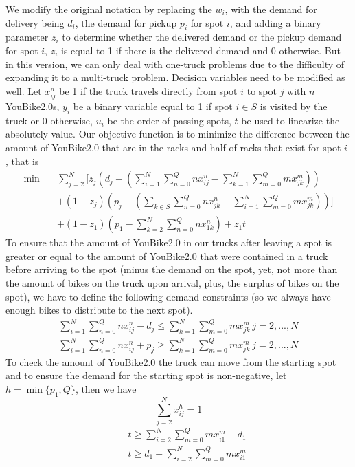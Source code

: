 \documentclass[12pt,a4paper]{article}
\begin{document}
We modify the original notation by replacing the $w_i$, with the demand for delivery being $d_i$, the demand for pickup $p_i$ for spot $i$, and adding a binary parameter $z_i$ to determine whether the delivered demand or the pickup demand for spot $i$, $z_i$ is equal to 1 if there is the delivered demand and 0 otherwise. But in this version, we can only deal with one-truck problems due to the difficulty of expanding it to a multi-truck problem. Decision variables need to be modified as well. Let $x_{ij}^n$ be 1 if the truck travels directly from spot $i$ to spot $j$ with $n$ YouBike2.0s, $y_i$ be a binary variable equal to 1 if spot $i \in S$ is visited by the truck or 0 otherwise, $u_i$ be the order of passing spots, $t$ be used to linearize the absolutely value. Our objective function is to minimize the difference between the amount of YouBike2.0 that are in the racks and half of racks that exist for spot $i$ , that is
\[\begin{split}
\min \quad & \sum_{j = 2}^N[z_j(d_j - (\sum_{i=1}^N\sum_{n = 0}^Qnx_{ij}^n - \sum_{k=1}^N\sum_{m=0}^Qmx_{jk}^m)) \\
\quad & + (1-z_j)(p_j - (\sum_{k \in S}\sum_{n=0}^Qnx_{jk}^n -\sum_{i =1}^N\sum_{m=0}^Qmx_{jk}^m))] \\
\quad & +(1-z_1)(p_1 - \sum_{k=2}^N\sum_{n=0}^Qnx_{1k}^n) + z_1t
\end{split}
\]
To ensure that the amount of YouBike2.0 in our trucks after leaving a spot is greater or equal to the amount of YouBike2.0 that were contained in a truck before arriving to the spot (minus the demand on the spot, yet, not more than the amount of bikes on the truck upon arrival, plus, the surplus of bikes on the spot), we have to define the following demand constraints (so we always have enough bikes to distribute to the next spot).
\[\begin{split}
    \sum_{i=1}^N\sum_{n=0}^Qnx_{ij}^n - d_j \leq \sum_{k=1}^N\sum_{m=0}^Qmx_{jk}^m \ j=2,...,N \\
    \sum_{i=1}^N\sum_{n=0}^Qnx_{ij}^n + p_j \geq \sum_{k=1}^N\sum_{m=0}^Qmx_{jk}^m \ j=2,...,N
\end{split}
\]
To check the amount of YouBike2.0 the truck can move from the starting spot and to ensure the demand for the starting spot is non-negative, let $h = \min\{p_1, Q\}$, then we have
\[
\sum_{j=2}^Nx_{ij}^h = 1
\]
\[\begin{split}
    \quad & t \geq \sum_{i=2}^N\sum_{m=0}^Qmx_{i1}^m - d_1 \\
    \quad & t \geq d_1- \sum_{i=2}^N\sum_{m=0}^Qmx_{i1}^m
\end{split}
\]
\end{document}
